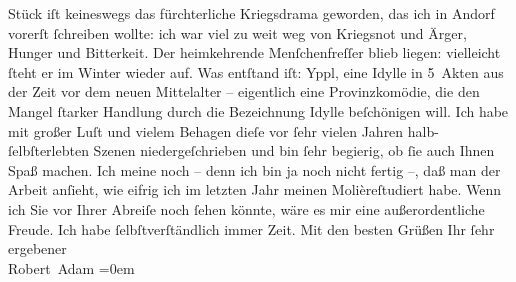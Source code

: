 \begin{ledgroupsized}[t]{13cm}
                    Stück iſt keineswegs das fürchterliche Kriegsdrama geworden, das ich in Andorf vorerſt ſchreiben wollte: ich war viel zu weit weg
                    von Kriegsnot und Ärger, Hunger und Bitterkeit. Der heimkehrende Menſchenfreſſer
                    blieb liegen: vielleicht ſteht er im Winter wieder auf. Was entſtand iſt: Yppl, eine Idylle in 5 Akten aus der Zeit vor
                    dem neuen Mittelalter – eigentlich eine Provinzkomödie, die den Mangel ſtarker
                    Handlung durch die Bezeichnung Idylle beſchönigen will. Ich habe mit großer Luſt
                    und vielem Behagen dieſe vor ſehr vielen Jahren halb-ſelbſterlebten Szenen
                    niedergeſchrieben und bin ſehr begierig, ob ſie auch Ihnen Spaß machen. Ich
                    meine noch – denn ich bin ja noch nicht fertig –, daß man der Arbeit anſieht,
                    wie eifrig ich im letzten Jahr meinen Molièreſtudiert habe.\pend
           \pstart
           {\pb}Wenn ich Sie vor Ihrer Abreiſe noch
                    ſehen könnte, wäre es mir \introOben{}eine\introOben{} außerordentliche Freude.
                    Ich habe ſelbſtverſtändlich immer Zeit.\pend
           \pstart
           Mit den besten Grüßen Ihr ſehr ergebener{\\[\baselineskip]}\spacefill\mbox{Robert Adam}\pend
           \leftskip=0em{}
         
         \endnumbering{}\end{ledgroupsized}  \newcommand{\dateiname}{L02291}\newcommand{\titel}{Robert Adam an Arthur Schnitzler, 29. 7. 1918}\newcommand{\editorInnen}{Martin Anton Müller und Gerd-Hermann Susen}
      